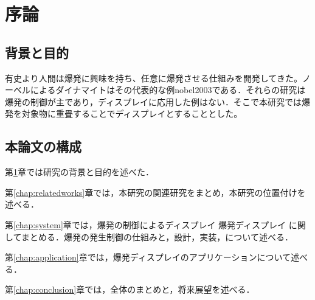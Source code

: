 \chapter{序論}
\label{chap:introduction}
\section{背景と目的}

有史より人間は爆発に興味を持ち、任意に爆発させる仕組みを開発してきた。ノーベルによるダイナマイトはその代表的な例\cite{biblio}{nobel2003}である．それらの研究は爆発の制御が主であり，ディスプレイに応用した例はない．そこで本研究では爆発を対象物に重畳することでディスプレイとすることとした。

\section{本論文の構成}

第\ref{chap:introduction}章では研究の背景と目的を述べた．

第\ref{chap:relatedworks}章では，本研究の関連研究をまとめ，本研究の位置付けを述べる．

第\ref{chap:system}章では，爆発の制御によるディスプレイ 爆発ディスプレイ に関してまとめる．爆発の発生制御の仕組みと，設計，実装，について述べる．

第\ref{chap:application}章では，爆発ディスプレイのアプリケーションについて述べる．

第\ref{chap:conclusion}章では，全体のまとめと，将来展望を述べる．
